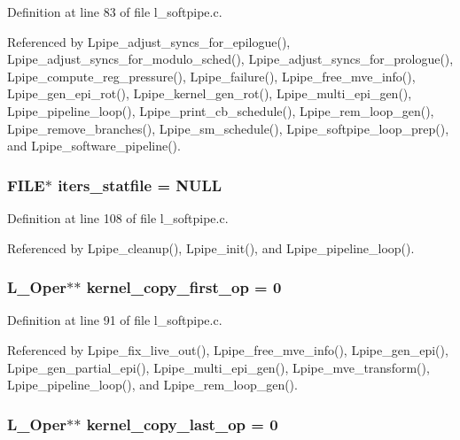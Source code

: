 Definition at line 83 of file l\_\-softpipe.c.

Referenced by Lpipe\_\-adjust\_\-syncs\_\-for\_\-epilogue(), Lpipe\_\-adjust\_\-syncs\_\-for\_\-modulo\_\-sched(), Lpipe\_\-adjust\_\-syncs\_\-for\_\-prologue(), Lpipe\_\-compute\_\-reg\_\-pressure(), Lpipe\_\-failure(), Lpipe\_\-free\_\-mve\_\-info(), Lpipe\_\-gen\_\-epi\_\-rot(), Lpipe\_\-kernel\_\-gen\_\-rot(), Lpipe\_\-multi\_\-epi\_\-gen(), Lpipe\_\-pipeline\_\-loop(), Lpipe\_\-print\_\-cb\_\-schedule(), Lpipe\_\-rem\_\-loop\_\-gen(), Lpipe\_\-remove\_\-branches(), Lpipe\_\-sm\_\-schedule(), Lpipe\_\-softpipe\_\-loop\_\-prep(), and Lpipe\_\-software\_\-pipeline().
\subsubsection{\setlength{\rightskip}{0pt plus 5cm}FILE$\ast$ \bf{iters\_\-statfile} = NULL}\label{l__softpipe_8c_065f771def475aca9432d340c6eaf35b}




Definition at line 108 of file l\_\-softpipe.c.

Referenced by Lpipe\_\-cleanup(), Lpipe\_\-init(), and Lpipe\_\-pipeline\_\-loop().
\subsubsection{\setlength{\rightskip}{0pt plus 5cm}L\_\-Oper$\ast$$\ast$ \bf{kernel\_\-copy\_\-first\_\-op} = 0}\label{l__softpipe_8c_394714920d405996c9ac56376596536a}




Definition at line 91 of file l\_\-softpipe.c.

Referenced by Lpipe\_\-fix\_\-live\_\-out(), Lpipe\_\-free\_\-mve\_\-info(), Lpipe\_\-gen\_\-epi(), Lpipe\_\-gen\_\-partial\_\-epi(), Lpipe\_\-multi\_\-epi\_\-gen(), Lpipe\_\-mve\_\-transform(), Lpipe\_\-pipeline\_\-loop(), and Lpipe\_\-rem\_\-loop\_\-gen().
\subsubsection{\setlength{\rightskip}{0pt plus 5cm}L\_\-Oper$\ast$$\ast$ \bf{kernel\_\-copy\_\-last\_\-op} = 0}\label{l__softpipe_8c_43dd5bc461bab37b4dc35075227b76df}




